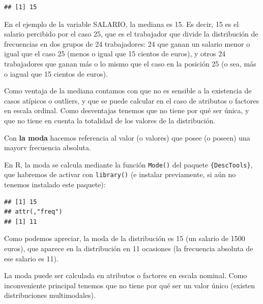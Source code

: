 \documentclass[
]{book}
\newenvironment{Shaded}{\begin{snugshade}}{\end{snugshade}}
\newcommand{\CommentTok}[1]{\textcolor[rgb]{0.56,0.35,0.01}{\textit{#1}}}
\newcommand{\FunctionTok}[1]{\textcolor[rgb]{0.13,0.29,0.53}{\textbf{#1}}}
\newcommand{\NormalTok}[1]{#1}
\newcommand{\OtherTok}[1]{\textcolor[rgb]{0.56,0.35,0.01}{#1}}
\newcommand{\SpecialCharTok}[1]{\textcolor[rgb]{0.81,0.36,0.00}{\textbf{#1}}}
\begin{document}
\begin{verbatim}
## [1] 15
\end{verbatim}

En el ejemplo de la variable SALARIO, la mediana es 15.
Es decir, 15 es el salario percibido por el caso 25, que es el trabajador que divide la distribución de frecuencias en dos grupos de 24 trabajadores: 24 que ganan un salario menor o igual que el caso 25 (menos o igual que 15 cientos de euros), y otros 24 trabajadores que ganan más o lo mismo que el caso en la posición 25 (o sea, más o iagual que 15 cientos de euros).

Como ventaja de la mediana contamos con que no es sensible a la existencia de casos atípicos o outliers, y que se puede calcular en el caso de atributos o factores en escala ordinal.
Como desventajas tenemos que no tiene por qué ser única, y que no tiene en cuenta la totalidad de los valores de la distribución.

Con \textbf{la moda} hacemos referencia al valor (o valores) que posee (o poseen) una mayorv frecuencia absoluta.

En R, la moda se calcula mediante la función \texttt{Mode()} del paquete \texttt{\{DescTools\}}, que habremos de activar con \texttt{library()} (e instalar previamente, si aún no tenemos instalado este paquete):

\begin{Shaded}
\end{Shaded}

\begin{verbatim}
## [1] 15
## attr(,"freq")
## [1] 11
\end{verbatim}

Como podemos apreciar, la moda de la distribución es 15 (un salario de 1500 euros), que aparece en la distribución en 11 ocasiones (la frecuencia absoluta de ese salario es 11).

La moda puede ser calculada en atributos o factores en escala nominal.
Como inconveniente principal tenemos que no tiene por qué ser un valor único (existen distribuciones multimodales).
\end{document}
